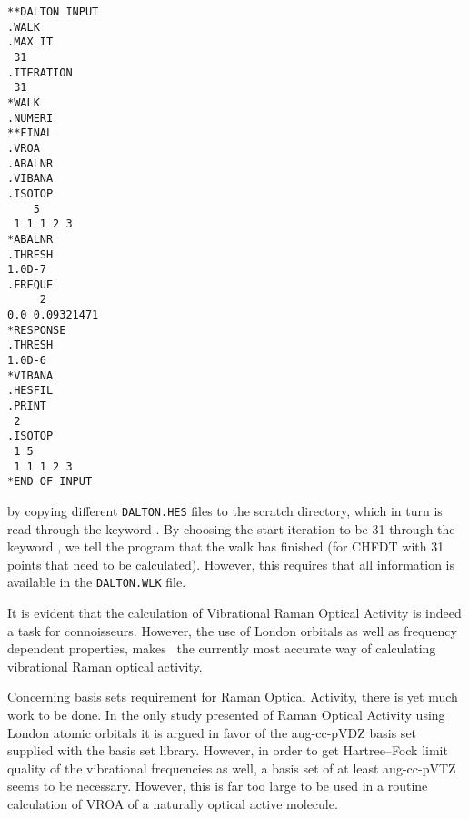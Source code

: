 \begin{verbatim}
**DALTON INPUT
.WALK
.MAX IT
 31
.ITERATION
 31
*WALK
.NUMERI
**FINAL
.VROA
.ABALNR
.VIBANA
.ISOTOP
    5
 1 1 1 2 3
*ABALNR
.THRESH
1.0D-7
.FREQUE
     2
0.0 0.09321471
*RESPONSE
.THRESH
1.0D-6
*VIBANA
.HESFIL
.PRINT
 2
.ISOTOP
 1 5
 1 1 1 2 3
*END OF INPUT
\end{verbatim}
by copying different \verb|DALTON.HES| files to the scratch
directory, which in turn is read through the keyword . By
choosing the start iteration to be 31 through the keyword
, we tell the program that the walk has finished (for
CHFDT with 31 points that need to be calculated). However, this
requires that all information is available in the \verb|DALTON.WLK|
file.

It is evident that the calculation of Vibrational Raman Optical
Activity is indeed a task for
connoisseurs. However, the use of London 
orbitals as well as frequency dependent properties, makes \siraba\ the
currently most accurate way of calculating vibrational Raman optical activity. 

Concerning basis sets requirement for Raman Optical Activity, 
there is yet much work to be done. In the only study
presented of Raman Optical Activity using London atomic orbitals it is
argued in favor of the aug-cc-pVDZ basis set supplied with the basis
set library. However, in order to get Hartree--Fock limit quality of
the vibrational frequencies as well, a basis set of at least
aug-cc-pVTZ seems to be necessary. However, this is far too large to
be used in a routine calculation of VROA of a naturally optical active molecule.
